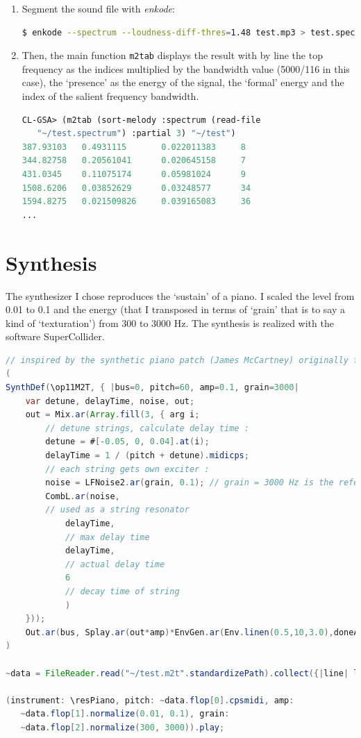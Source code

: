 \begin{enumerate}
\item
Segment the sound file with \textsl{enkode}:
\begin{lstlisting}[language=bash]
$ enkode --spectrum --loudness-diff-thres=1.48 test.mp3 > test.spectrum
\end{lstlisting}

\item
Then, the main function \texttt{m2tab} displays the result with by line the top frequency as the indices multiplied by the bandwidth value (5000/116 in this case), the `presence' as the energy of the signal, the `formal' energy and the index of the salient frequency bandwidth.   
\begin{lstlisting}[language=Lisp]
CL-GSA> (m2tab (sort-melody :spectrum (read-file 
   "~/test.spectrum") :partial 3) "~/test")
387.93103   0.4931115       0.022011383     8
344.82758   0.20561041      0.020645158     7
431.0345    0.11075174      0.05981024      9
1508.6206   0.03852629      0.03248577      34
1594.8275   0.021509826     0.039165083     36
...
\end{lstlisting}
\end{enumerate}

\section{Synthesis}

The synthesizer I chose reproduces the `sustain' of a piano. I scaled the level from 0.01 to 0.1 and the energy (that I transposed in terms of `grain' that is to say a kind of `texturation') from 300 to 3000 Hz. The synthesis is realized with the software SuperCollider.
\newpage
\begin{lstlisting}[language=Java]
// inspired by the synthetic piano patch (James McCartney) originally for SC2, 1998.
(
SynthDef(\op11M2T, { |bus=0, pitch=60, amp=0.1, grain=3000|
	var detune, delayTime, noise, out;
	out = Mix.ar(Array.fill(3, { arg i;
		// detune strings, calculate delay time :
		detune = #[-0.05, 0, 0.04].at(i);
		delayTime = 1 / (pitch + detune).midicps;
		// each string gets own exciter :
		noise = LFNoise2.ar(grain, 0.1); // grain = 3000 Hz is the reference
		CombL.ar(noise,		
		// used as a string resonator
			delayTime, 	
			// max delay time
			delayTime,	
			// actual delay time
			6
			// decay time of string
			)
	}));
	Out.ar(bus, Splay.ar(out*amp)*EnvGen.ar(Env.linen(0.5,10,3.0),doneAction:2))}).add
)

~data = FileReader.read("~/test.m2t".standardizePath).collect({|line| line.collect({|val| val.asFloat})}) 
 
(instrument: \resPiano, pitch: ~data.flop[0].cpsmidi, amp:
   ~data.flop[1].normalize(0.01, 0.1), grain: 
   ~data.flop[2].normalize(300, 3000)).play;
\end{lstlisting}

